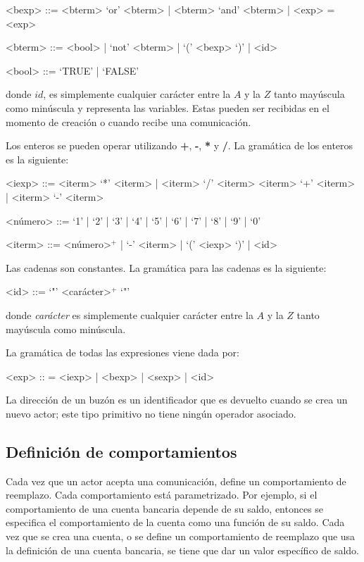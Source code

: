 \begin{grammar}

<bexp> ::= <bterm> `or' <bterm> | <bterm> `and' <bterm> | <exp> = <exp>
  
<bterm> ::= <bool> | `not' <bterm> | `(' <bexp> `)' | <id>

<bool> ::= `TRUE' | `FALSE'

\end{grammar}
donde $id$, es simplemente cualquier carácter entre la $A$ y la $Z$ tanto mayúscula como minúscula y representa las variables. Estas pueden ser recibidas en el momento de creación o cuando recibe una comunicación.

Los enteros se pueden operar utilizando \textbf{+}, \textbf{-}, \textbf{*} y \textbf{/}. La gramática de los enteros es la siguiente:
\begin{grammar}

<iexp> ::= <iterm> `*' <iterm> | <iterm> `/' <iterm> 
\alt <iterm> `+' <iterm>  | <iterm> `-' <iterm>

<número> ::= `1' | `2' | `3' | `4' | `5' | `6' | `7' | `8' | `9' | `0'

<iterm> ::= <número>$^{+}$ | `-' <iterm> | `(' <iexp> `)' | <id> 

\end{grammar}
Las cadenas son constantes. La gramática para las cadenas es la siguiente:
\begin{grammar}
 <id> ::= `"' <carácter>$^{+}$ `"'
\end{grammar}
donde \textit{carácter} es simplemente cualquier carácter entre la $A$ y la $Z$ tanto mayúscula como minúscula.

La gramática de todas las expresiones viene dada por:
\begin{grammar}
<exp> :: = <iexp> | <bexp> | <sexp> | <id>  
\end{grammar}

La dirección de un buzón es un identificador que es devuelto cuando se crea un nuevo actor; este tipo primitivo no tiene ningún operador asociado. 

\subsection{Definición de comportamientos}\label{actores:beha}

Cada vez que un actor acepta una comunicación, define un comportamiento de reemplazo. Cada comportamiento está parametrizado. Por ejemplo, si el comportamiento de una cuenta bancaria depende de su saldo, entonces se especifica el comportamiento de la cuenta como una función de su saldo. Cada vez que se crea una cuenta, o se define un comportamiento de reemplazo que usa la definición de una cuenta bancaria, se tiene que dar un valor específico de saldo.

